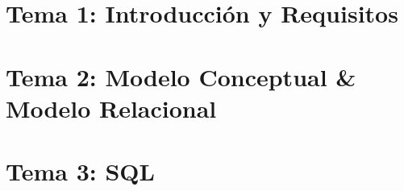 \renewcommand{\contentsname}{Indice}
\tableofcontents
\newpage
\section{Tema 1: Introducción y Requisitos}

\newpage
\section{Tema 2: Modelo Conceptual \& Modelo Relacional}

\newpage
\section{Tema 3: SQL}

